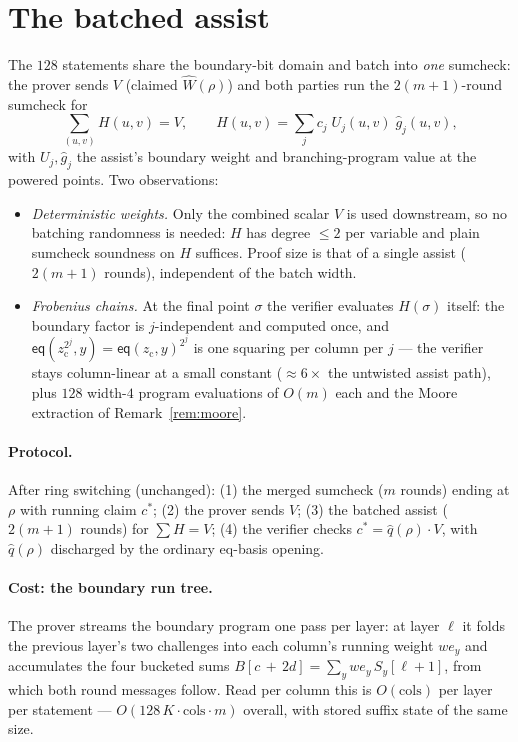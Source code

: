 \documentclass[11pt]{article}
\newcommand{\eq}{\mathsf{eq}}
\begin{document}
\section{The batched assist}\label{sec:protocol}

The $128$ statements share the boundary-bit domain and batch into
\emph{one} sumcheck: the prover sends $V$ (claimed
$\widehat W(\rho)$) and both parties run the $2(m{+}1)$-round sumcheck
for
\[
  \sum_{(u,v)} H(u,v) = V,
  \qquad
  H(u,v) = \sum_{j} c_{j}\; U_{j}(u,v)\; \hat g_{j}(u,v),
\]
with $U_{j}, \hat g_{j}$ the assist's boundary weight and
branching-program value at the powered points. Two observations:

\begin{itemize}[nosep]
\item \emph{Deterministic weights.} Only the combined scalar $V$ is
  used downstream, so no batching randomness is needed: $H$ has degree
  $\le 2$ per variable and plain sumcheck soundness on $H$ suffices.
  Proof size is that of a single assist ($2(m{+}1)$ rounds),
  independent of the batch width.
\item \emph{Frobenius chains.} At the final point $\sigma$ the verifier
  evaluates $H(\sigma)$ itself: the boundary factor is
  $j$-independent and computed once, and
  $\eq(z_{\mathrm c}^{2^j}, y) = \eq(z_{\mathrm c}, y)^{2^j}$ is one
  squaring per column per $j$ --- the verifier stays column-linear at
  a small constant ($\approx 6\times$ the untwisted assist path), plus
  $128$ width-$4$ program evaluations of $O(m)$ each and the Moore
  extraction of Remark~\ref{rem:moore}.
\end{itemize}

\paragraph{Protocol.} After ring switching (unchanged): (1) the merged
sumcheck ($m$ rounds) ending at $\rho$ with running claim $c^*$;
(2) the prover sends $V$; (3) the batched assist ($2(m{+}1)$ rounds)
for $\sum H = V$; (4) the verifier checks
$c^* = \hat q(\rho)\cdot V$, with $\hat q(\rho)$ discharged by the
ordinary eq-basis opening.

\paragraph{Cost: the boundary run tree.}\label{par:runtree}
The prover streams the boundary program one pass per layer: at layer
$\ell$ it folds the previous layer's two challenges into each column's
running weight $we_y$ and accumulates the four bucketed sums
$B[c\,{+}\,2d] = \sum_y we_y\, S_y[\ell{+}1]$, from which both round
messages follow. Read per column this is $O(\mathrm{cols})$ per layer
per statement --- $O(128\,K \cdot \mathrm{cols} \cdot m)$ overall, with
stored suffix state of the same size.
\end{document}

